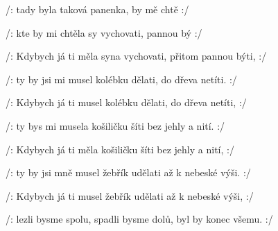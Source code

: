 

\zs
/:  tady byla taková panenka,
 by mě chtě :/

/: kte by mi chtěla sy vychovati,
 pannou bý :/
\ks

\zs
/: Kdybych já ti měla syna vychovati, přitom pannou býti, :/

/: ty by jsi mi musel kolébku dělati, do dřeva netíti. :/
\ks

\zs
/: Kdybych já ti musel kolébku dělati, do dřeva netíti, :/

/: ty bys mi musela košiličku šíti bez jehly a nití. :/
\ks

\zs
/: Kdybych já ti měla košiličku šíti bez jehly a nití, :/

/: ty by jsi mně musel žebřík udělati až k nebeské výši. :/
\ks

\zs
/: Kdybych já ti musel žebřík udělati až k nebeské výši, :/

/: lezli bysme spolu, spadli bysme dolů, byl by konec všemu. :/
\ks

\kp























